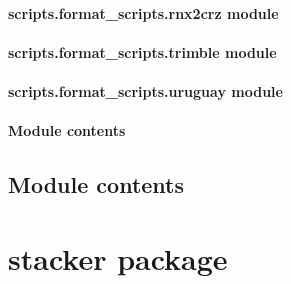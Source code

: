 \documentclass[letterpaper,10pt,english]{sphinxmanual}
\begin{document}
\paragraph{scripts.format\_scripts.rnx2crz module}
\label{\detokenize{scripts.format_scripts:scripts-format-scripts-rnx2crz-module}}

\paragraph{scripts.format\_scripts.trimble module}
\label{\detokenize{scripts.format_scripts:module-scripts.format_scripts.trimble}}\label{\detokenize{scripts.format_scripts:scripts-format-scripts-trimble-module}}

\paragraph{scripts.format\_scripts.uruguay module}
\label{\detokenize{scripts.format_scripts:scripts-format-scripts-uruguay-module}}

\paragraph{Module contents}
\label{\detokenize{scripts.format_scripts:module-scripts.format_scripts}}\label{\detokenize{scripts.format_scripts:module-contents}}

\subsection{Module contents}
\label{\detokenize{scripts:module-scripts}}\label{\detokenize{scripts:module-contents}}
\sphinxstepscope


\section{stacker package}
\label{\detokenize{stacker:stacker-package}}\label{\detokenize{stacker::doc}}
\end{document}
